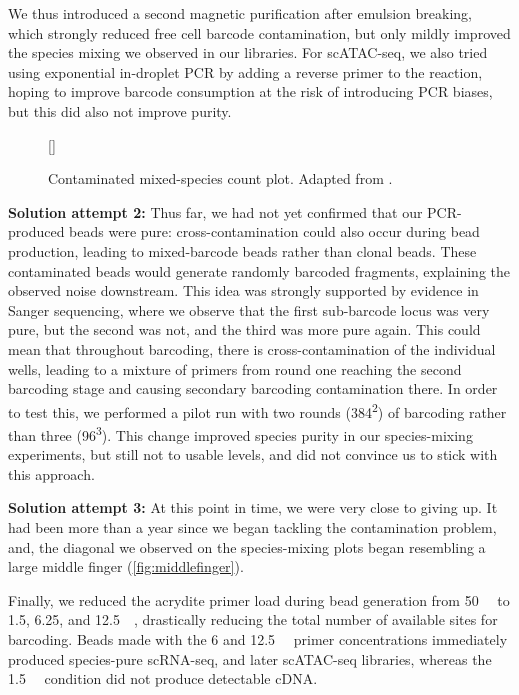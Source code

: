 We thus introduced a second magnetic purification after emulsion breaking, which strongly reduced free cell barcode contamination, but only mildly improved the species mixing we observed in our libraries. For scATAC-seq, we also tried using exponential in-droplet PCR by adding a reverse primer to the reaction, hoping to improve barcode consumption at the risk of introducing PCR biases, but this did also not improve purity.

\begin{figure}
	\centering
	\raisebox{0pt}[\dimexpr{}\baselineskip\relax]{%
		
	}
	\caption[Contaminated mixed-species count plot]{Contaminated mixed-species count plot. Adapted from .}
	\label{fig:middlefinger}
\end{figure}

\textbf{Solution attempt 2:} Thus far, we had not yet confirmed that our PCR-produced beads were pure: cross-contamination could also occur during bead production, leading to mixed-barcode beads rather than clonal beads. These contaminated beads would generate randomly barcoded fragments, explaining the observed noise downstream. This idea was strongly supported by evidence in Sanger sequencing, where we observe that the first sub-barcode locus was very pure, but the second was not, and the third was more pure again. This could mean that throughout barcoding, there is cross-contamination of the individual wells, leading to a mixture of primers from round one reaching the second barcoding stage and causing secondary barcoding contamination there. In order to test this, we performed a pilot run with two rounds (384\textsuperscript{2}) of barcoding rather than three (96\textsuperscript{3}). This change improved species purity in our species-mixing experiments, but still not to usable levels, and did not convince us to stick with this approach.

\textbf{Solution attempt 3:} At this point in time, we were very close to giving up. It had been more than a year since we began tackling the contamination problem, and, the diagonal we observed on the species-mixing plots began resembling a large middle finger (\autoref{fig:middlefinger}).

Finally, we reduced the acrydite primer load during bead generation from \SI{50}{\micro\molar} to \num{1.5}, \num{6.25}, and \SI{12.5}{\micro\molar}, drastically reducing the total number of available sites for barcoding. Beads made with the 6 and \SI{12.5}{\micro\molar} primer concentrations immediately produced species-pure scRNA-seq, and later scATAC-seq libraries, whereas the \SI{1.5}{\micro\molar} condition did not produce detectable cDNA.

